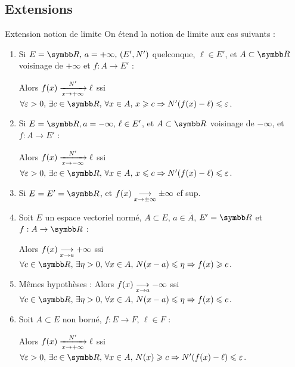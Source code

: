 \subsection{Extensions}

\begin{definition}{Extension notion de limite}{}
    On étend la notion de limite aux cas suivants : 
    \begin{enumerate}
        \item Si $E = \R, \, a = + \infty, \, (E', N')$ quelconque, $\ell \in E'$, et $A \subset \R$ 
            voisinage de $+ \infty$ et $f : A \to E'$ :

            Alors $f(x) \limitnorme{N'}{x}{+ \infty} \ell$ ssi $\forall \varepsilon > 0, \, \exists c \in \R, \, \forall x \in A, \, x \geqslant c \Rightarrow N'(f(x) - \ell) \leqslant \varepsilon$.

        \item Si $E = \R, a = - \infty, \, \ell \in E'$, et $A \subset \R$ voisinage de $- \infty$, et $f : A \to E'$ :

            Alors $f(x) \limitnorme{N'}{x}{- \infty} \ell$ ssi $\forall \varepsilon > 0, \, \exists c \in \R, \, \forall x \in A, \, x \leqslant c \Rightarrow N'(f(x) - \ell) \leqslant \varepsilon$.
        
        \item Si $E = E' = \R$, et $f(x) \limit x {\pm \infty} \pm \infty$ cf sup.
        
        \item Soit $E$ un espace vectoriel normé, $A \subset E$, $a \in \overline A$, $E' = \R$ et $f: A \to \R$ :

        Alors $f(x) \limit x a + \infty$ ssi $\forall c \in \R, \, \exists \eta > 0, \, \forall x \in A, \, N(x - a) \leqslant \eta \Rightarrow f(x) \geqslant c$.

        \item Mêmes hypothèses : Alors $f(x) \limit x a - \infty$ ssi $\forall c \in \R, \, \exists \eta > 0, \, \forall x \in A, \, N(x - a) \leqslant \eta \Rightarrow f(x) \leqslant c$.
        \item Soit $A \subset E$ non borné, $f : E \to F, \, \ell \in F$ :

        Alors $f(x) \limitnorme{N'}{x}{+ \infty} \ell$ ssi $\forall \varepsilon > 0, \, \exists c \in \R, \, \forall x \in A, \, N(x) \geqslant c \Rightarrow N'(f(x) - \ell) \leqslant \varepsilon$.
    \end{enumerate}
\end{definition}

